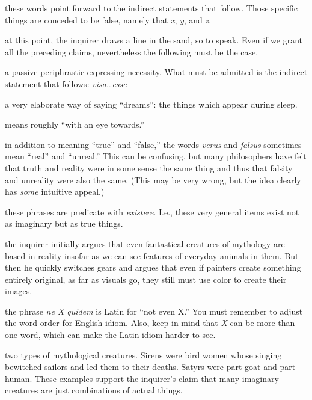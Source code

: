  these words point forward to the indirect statements that follow. Those specific things are conceded to be false, namely that \textit{x}, \textit{y}, and \textit{z}.

 at this point, the inquirer draws a line in the sand, so to speak. Even if we grant all the preceding claims, nevertheless the following must be the case.

 a passive periphrastic expressing necessity. What must be admitted is the indirect statement that follows: \textit{visa\dots esse}

 a very elaborate way of saying ``dreams'': the things which appear during sleep.

 means roughly ``with an eye towards.''

 in addition to meaning ``true'' and ``false,'' the words \textit{verus} and \textit{falsus} sometimes mean ``real'' and ``unreal.'' This can be confusing, but many philosophers have felt that truth and reality were in some sense the same thing and thus that falsity and unreality were also the same. (This may be very wrong, but the idea clearly has \textit{some} intuitive appeal.)

 these phrases are predicate with \textit{existere}. I.e., these very general items exist not as imaginary but as true things.

 the inquirer initially argues that even fantastical creatures of mythology are based in reality insofar as we can see features of everyday animals in them. But then he quickly switches gears and argues that even if painters create something entirely original, as far as visuals go, they still must use color to create their images.

 the phrase \textit{ne X quidem} is Latin for ``not even X.'' You must remember to adjust the word order for English idiom. Also, keep in mind that \textit{X} can be more than one word, which can make the Latin idiom harder to see.

 two types of mythological creatures. Sirens were bird women whose singing bewitched sailors and led them to their deaths. Satyrs were part goat and part human. These examples support the inquirer's claim that many imaginary creatures are just combinations of actual things.

